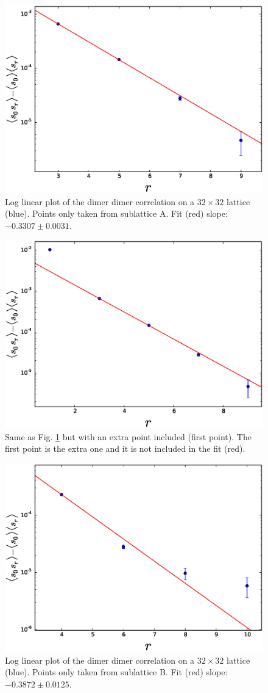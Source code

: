 \documentclass[aps,floatfix,11pt]{revtex4-1}
\begin{document}
\begin{figure}[h]
    \centering
    \includegraphics[width=8.5 cm]{s_dimer_dimer_cor_loglin_one_sublat_A_32x32}
    \caption{Log linear plot of the dimer dimer correlation on a $32\times32$ lattice (blue). 
        Points only taken from sublattice A. Fit (red) slope: $-0.3307 \pm 0.0031$. 
    \label{fig:s_dimer_dimer_cor_loglin_one_sublat_A_32x32}}
\end{figure}

\begin{figure}[h]
    \centering
    \includegraphics[width=8.5 cm]{s_dimer_dimer_cor_loglin_one_sublat_A_32x32_extra_pnt}
    \caption{Same as Fig. \ref{fig:s_dimer_dimer_cor_loglin_one_sublat_A_32x32} but with an extra
        point included (first point). The first point is the extra one and 
        it is not included in the fit (red).
    \label{fig:s_dimer_dimer_cor_loglin_one_sublat_A_32x32_extra_pnt}}
\end{figure}

\begin{figure}[h]
    \centering
    \includegraphics[width=8.5 cm]{s_dimer_dimer_cor_loglin_one_sublat_B_32x32}
    \caption{Log linear plot of the dimer dimer correlation on a $32\times32$ lattice (blue). 
        Points only taken from sublattice B. Fit (red) slope: $-0.3872 \pm 0.0125$. 
    \label{fig:s_dimer_dimer_cor_loglin_one_sublat_B_32x32}}
\end{figure}
\end{document}
